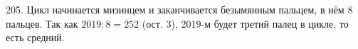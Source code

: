 205. Цикл начинается мизинцем и заканчивается безымянным пальцем, в нём 8 пальцев. Так как $2019:8=252$ (ост. 3), 2019-м будет третий палец в цикле, то есть средний.\\
